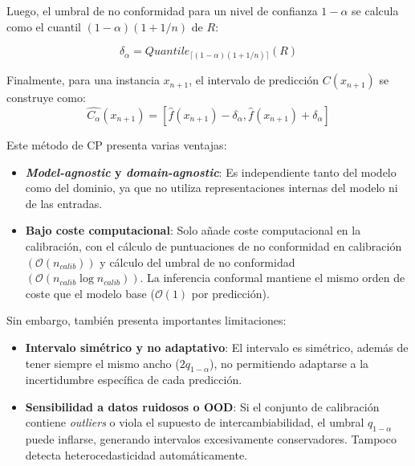 Luego, el umbral de no conformidad para un nivel de confianza $1-\alpha$ se calcula como el cuantil 
$(1-\alpha)(1+1/n)$ de $R$:

$$
\delta_\alpha = Quantile_{ \lceil  (1-\alpha) (1 + 1/n)  \rceil } ( R )
$$

Finalmente, para una instancia $x_{n+1}$, el intervalo de predicción $C(x_{n+1})$ se construye como: 
$$
\hat{C_\alpha}(x_{n+1}) = \left[ \hat{f}(x_{n+1}) - \delta_\alpha, \hat{f}(x_{n+1}) + \delta_\alpha\right]
$$


Este método de CP presenta varias ventajas: 

\begin{itemize}
    \item \textbf{\textit{Model-agnostic} y \textit{domain-agnostic}}: Es independiente tanto del modelo como 
    del dominio, ya que no utiliza representaciones internas del modelo ni de las entradas. 
    
    \item \textbf{Bajo coste computacional}: Solo añade coste computacional en la calibración, con el 
    cálculo de puntuaciones de no conformidad en calibración $\left( \mathcal{O}(n_{calib}) \right)$ y
    cálculo del umbral de no conformidad $\left( \mathcal{O}(n_{calib} \log n_{calib}) \right)$. La 
    inferencia conformal mantiene el mismo orden de coste que el modelo base ($\mathcal{O}(1)$ por 
    predicción). 

\end{itemize}

Sin embargo, también presenta importantes limitaciones: 

\begin{itemize}
    
    \item \textbf{Intervalo simétrico y no adaptativo}: El intervalo es simétrico, además de tener siempre el 
    mismo ancho ($2q_{1-\alpha}$), no permitiendo adaptarse a la incertidumbre específica de cada predicción. 

    \item \textbf{Sensibilidad a datos ruidosos o OOD}: 
    Si el conjunto de calibración contiene \textit{outliers} o viola el supuesto de intercambiabilidad, el 
    umbral \(q_{1-\alpha}\) puede inflarse, generando intervalos excesivamente conservadores. Tampoco detecta 
    heterocedasticidad automáticamente.

\end{itemize}


